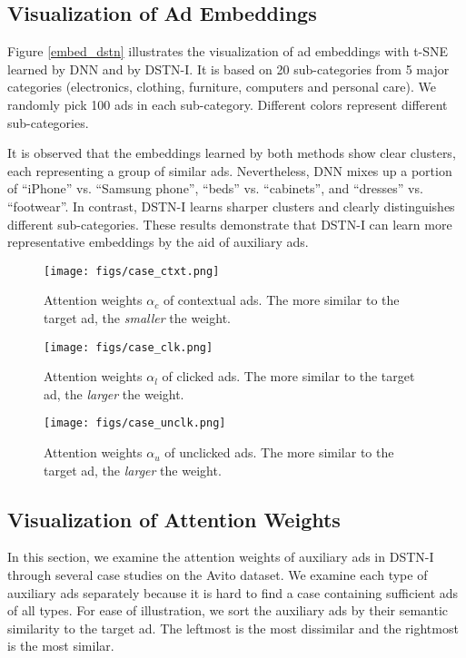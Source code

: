 \documentclass[sigconf]{acmart}
\begin{document}
\subsection{Visualization of Ad Embeddings} \label{sec_vis_emb}
Figure \ref{embed_dstn} illustrates the visualization of ad embeddings with t-SNE \cite{maaten2008visualizing} learned by DNN and by DSTN-I. It is based on 20 sub-categories from 5 major categories (electronics, clothing, furniture, computers and personal care). We randomly pick 100 ads in each sub-category. Different colors represent different sub-categories.

It is observed that the embeddings learned by both methods show clear clusters, each representing a group of similar ads. Nevertheless, DNN mixes up a portion of ``iPhone'' vs. ``Samsung phone'', ``beds'' vs. ``cabinets'', and ``dresses'' vs. ``footwear''. In contrast, DSTN-I learns sharper clusters and clearly distinguishes different sub-categories. These results demonstrate that DSTN-I can learn more representative embeddings by the aid of auxiliary ads.

\begin{figure}[!t]
\centering
\texttt{[image: figs/case\_ctxt.png]}
\vskip -8pt
\caption{Attention weights $\alpha_c$ of contextual ads. The more similar to the target ad, the \emph{smaller} the weight.}
\vskip -6pt
\label{case_ctxt}
\end{figure}

\begin{figure}[!t]
\centering
\texttt{[image: figs/case\_clk.png]}
\vskip -8pt
\caption{Attention weights $\alpha_l$ of clicked ads. The more similar to the target ad, the \emph{larger} the weight.}
\vskip -6pt
\label{case_clk}
\end{figure}

\begin{figure}[!t]
\centering
\texttt{[image: figs/case\_unclk.png]}
\vskip -8pt
\caption{Attention weights $\alpha_u$ of unclicked ads. The more similar to the target ad, the \emph{larger} the weight.}
\vskip -6pt
\label{case_unclk}
\end{figure}

\subsection{Visualization of Attention Weights}
In this section, we examine the attention weights of auxiliary ads in DSTN-I through several case studies on the Avito dataset. We examine each type of auxiliary ads separately because it is hard to find a case containing sufficient ads of all types. For ease of illustration, we sort the auxiliary ads by their semantic similarity to the target ad. The leftmost is the most dissimilar and the rightmost is the most similar.
\end{document}
